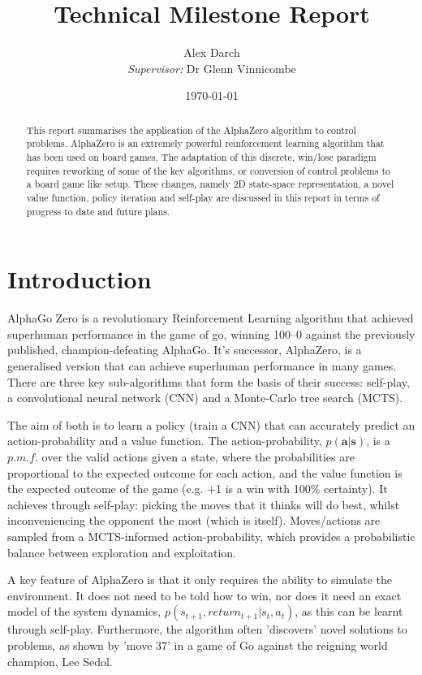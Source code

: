 \documentclass[11.7pt]{article}
\author{Alex Darch \\
   \textit{Supervisor:} Dr Glenn Vinnicombe}
\title{Technical Milestone Report}
\date{\today}
\begin{document}
%

\maketitle

\renewcommand{\abstractname}{Summary}
\begin{abstract}
This report summarises the application of the AlphaZero algorithm to control problems. AlphaZero is an extremely powerful reinforcement learning algorithm that has been used on board games. The adaptation of this discrete, win/lose paradigm requires reworking of some of the key algorithms, or conversion of control problems to a board game like setup. These changes, namely 2D state-space representation, a novel value function, policy iteration and self-play are discussed in this report in terms of progress to date and future plans.
\end{abstract}

\section{Introduction}

AlphaGo Zero is a revolutionary Reinforcement Learning algorithm that achieved superhuman performance in the game of go, winning 100–0 against the previously published, champion-defeating AlphaGo. It's successor, AlphaZero, is a generalised version that can achieve superhuman performance in many games. There are three key sub-algorithms that form the basis of their success: self-play, a convolutional neural network (CNN) and a Monte-Carlo tree search (MCTS). 

The aim of both is to learn a policy (train a CNN) that can accurately predict an action-probability and a value function. The action-probability, $p(\boldsymbol{a}|\boldsymbol{s})$, is a $p.m.f.$ over the valid actions given a state, where the probabilities are proportional to the expected outcome for each action, and the value function is the expected outcome of the game (e.g. +1 is a win with 100\% certainty). It achieves through self-play: picking the moves that it thinks will do best, whilst inconveniencing the opponent the most (which is itself). Moves/actions are sampled from a MCTS-informed action-probability, which provides a probabilistic balance between exploration and exploitation. 

A key feature of AlphaZero is that it only requires the ability to simulate the environment. It does not need to be told how to win, nor does it need an exact model of the system dynamics, $p(s_{t+1}, return_{t+1} |s_t, a_t)$, as this can be learnt through self-play. Furthermore, the algorithm often 'discovers' novel solutions to problems, as shown by 'move 37' in a game of Go against the reigning world champion, Lee Sedol.
\end{document}
